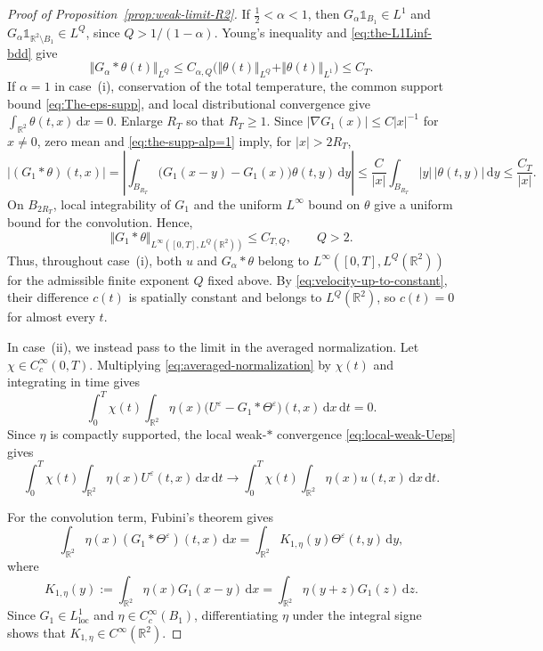 \documentclass[reqno,11pt,a4paper]{amsart}
\newcommand{\dd}{\mathrm{d}}
\begin{document}
\begin{proof}[Proof of Proposition~\ref{prop:weak-limit-R2}]
If $\frac12<\alpha<1$, then
$G_\alpha\mathds{1}_{B_1}\in L^1$ and
$G_\alpha\mathds{1}_{\mathbb R^2\setminus B_1}\in L^Q$,
since $Q>1/(1-\alpha)$.
Young's inequality and \eqref{eq:the-L1Linf-bdd} give
\[
  \Vert G_\alpha*\theta(t)\Vert _{L^Q}
  \leq C_{\alpha,Q}
  \bigl(\Vert \theta(t)\Vert _{L^Q}+\Vert \theta(t)\Vert _{L^1}\bigr)
  \leq C_T.
\]
If $\alpha=1$ in case~(i), conservation of the total
temperature, the common support bound
\eqref{eq:The-eps-supp}, and local distributional convergence
give $\int_{\mathbb R^2}\theta(t,x)\,\dd x=0$.
Enlarge $R_T$ so that $R_T\geq1$.
Since $|\nabla G_1(x)|\leq C|x|^{-1}$ for $x\ne0$,
zero mean and \eqref{eq:the-supp-alp=1} imply, for $|x|>2R_T$,
\[
  |(G_1*\theta)(t,x)|
  =\left|\int_{B_{R_T}}
    \bigl(G_1(x-y)-G_1(x)\bigr)\theta(t,y)\,\dd y\right|
  \leq \frac{C}{|x|}
    \int_{B_{R_T}}|y|\,|\theta(t,y)|\,\dd y
  \leq \frac{C_T}{|x|}.
\]
On $B_{2R_T}$, local integrability of $G_1$ and the
uniform $L^\infty$ bound on $\theta$ give a uniform bound
for the convolution. Hence,
\[
  \Vert G_1*\theta\Vert _{L^\infty([0,T],L^Q(\mathbb R^2))}
  \leq C_{T,Q},\qquad Q>2.
\]
Thus, throughout case~(i), both $u$ and $G_\alpha*\theta$
belong to $L^\infty([0,T],L^Q(\mathbb R^2))$
for the admissible finite exponent $Q$ fixed above.
By \eqref{eq:velocity-up-to-constant},
their difference $c(t)$ is spatially constant and belongs
to $L^Q(\mathbb R^2)$, so $c(t)=0$ for almost every $t$.

In case~(ii), we instead pass to the limit
in the averaged normalization.
Let $\chi\in C_c^\infty(0,T)$.
Multiplying \eqref{eq:averaged-normalization}
by $\chi(t)$ and integrating in time gives
\begin{equation}\label{eq:normalization-before-limit}
  \int_0^T\chi(t)\int_{\mathbb R^2}
  \eta(x)\bigl(
    U^\varepsilon-G_1*\Theta^\varepsilon
  \bigr)(t,x)\,\dd x\,\dd t=0.
\end{equation}
Since $\eta$ is compactly supported,
the local weak-$*$ convergence
\eqref{eq:local-weak-Ueps} gives
\begin{equation}\label{eq:limit-normalization-U}
  \int_0^T\chi(t)\int_{\mathbb R^2}
  \eta(x)U^\varepsilon(t,x)\,\dd x\,\dd t
  \longrightarrow
  \int_0^T\chi(t)\int_{\mathbb R^2}
  \eta(x)u(t,x)\,\dd x\,\dd t.
\end{equation}

For the convolution term, Fubini's theorem gives
\[
  \int_{\mathbb R^2}
  \eta(x)(G_1*\Theta^\varepsilon)(t,x)\,\dd x
  =
  \int_{\mathbb R^2}
  K_{1,\eta}(y)\Theta^\varepsilon(t,y)\,\dd y,
\]
where
\[
  K_{1,\eta}(y)
  :=
  \int_{\mathbb R^2}\eta(x)G_1(x-y)\,\dd x
  =
  \int_{\mathbb R^2}\eta(y+z)G_1(z)\,\dd z.
\]
Since $G_1\in L^1_{\mathrm{loc}}$ and
$\eta\in C_c^\infty(B_1)$,
differentiating $\eta$ under the integral signe shows that
$K_{1,\eta}\in C^\infty(\mathbb R^2)$.


\end{proof}
\end{document}
